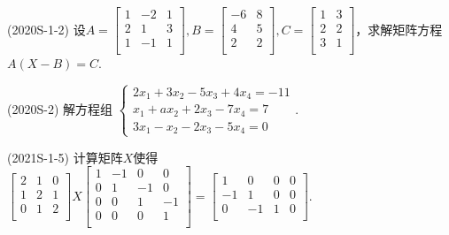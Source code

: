 \documentclass[lang=cn,newtx,10pt,scheme=chinese]{elegantbook}
\begin{document}
\begin{exercise}
    (2020S-1-2) 设$A=
    \left[
    \begin{matrix}
        1 & -2 & 1 \\
        2 & 1 & 3 \\
        1 & -1 & 1 \\
    \end{matrix}
    \right]
    ,B=
    \left[
    \begin{matrix}
        -6 & 8 \\
        4 & 5 \\
        2 & 2 \\
    \end{matrix}
    \right]
    ,C=
    \left[
    \begin{matrix}
        1 & 3 \\
        2 & 2 \\
        3 & 1 \\
    \end{matrix}
    \right]
    $，求解矩阵方程$A(X - B) = C$.
\end{exercise}

\begin{exercise}
    (2020S-2) 解方程组
    $
    \begin{cases}
        2 x_1 + 3 x_2 - 5 x_3 + 4 x_4 = -11 \\
        x_1 + a x_2 + 2 x_3 - 7 x_4 = 7 \\
        3 x_1 - x_2 - 2 x_3 - 5 x_4 = 0
    \end{cases}
    $.
\end{exercise}

\begin{exercise}
    (2021S-1-5) 计算矩阵$X$使得$
    \left[
    \begin{matrix}
        2 & 1 & 0 \\
        1 & 2 & 1 \\
        0 & 1 & 2 \\
    \end{matrix}
    \right]
    X
    \left[
    \begin{matrix}
        1 & -1 & 0 & 0 \\
        0 & 1 & -1 & 0 \\
        0 & 0 & 1 & -1 \\
        0 & 0 & 0 & 1 \\
    \end{matrix}
    \right]
    =
    \left[
    \begin{matrix}
        1 & 0 & 0 & 0 \\
        -1 & 1 & 0 & 0 \\
        0 & -1 & 1 & 0 \\
    \end{matrix}
    \right]
    $.
\end{exercise}
\end{document}
